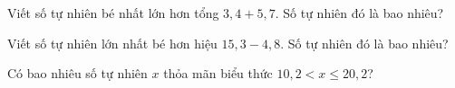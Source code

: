 \begin{ex}
  Viết số tự nhiên bé nhất lớn hơn tổng $3{,}4 + 5{,}7$. Số tự nhiên đó là bao nhiêu?
\end{ex}

\begin{ex}
  Viết số tự nhiên lớn nhất bé hơn hiệu $15{,}3 - 4{,}8$. Số tự nhiên đó là bao nhiêu?
\end{ex}

\begin{ex}
  Có bao nhiêu số tự nhiên $x$ thỏa mãn biểu thức $10{,}2 < x \le 20{,}2$?
\end{ex}
